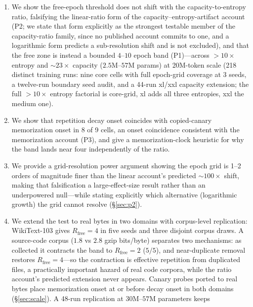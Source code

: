 \documentclass[11pt]{article}
\begin{document}
\begin{enumerate}
  \item We show the free-epoch threshold does not shift with the capacity-to-entropy
        ratio, falsifying the linear-ratio form of the capacity--entropy-artifact
        account (P2; we state that form explicitly as the strongest testable member
        of the capacity-ratio family, since no published account commits to one, and
        a logarithmic form predicts a sub-resolution shift and is not
        excluded), and that the free zone is instead a bounded $4$--$10$ epoch band
        (P1)---across $>10\times$ entropy and ${\sim}23\times$ capacity
        ($2.5$M--$57$M params) at 20M-token
        scale (218 distinct training runs: nine core cells with full epoch-grid
        coverage at 3 seeds, a twelve-run boundary seed audit, and a 44-run
        xl/xxl capacity extension; the full $>10\times$ entropy factorial is
        core-grid, xl adds all three entropies, xxl the medium one).
  \item We show that repetition decay onset coincides with copied-canary memorization
        onset in 8 of 9 cells, an onset coincidence consistent with the memorization
        account \citep{tirumala2022memorization} (P3), and give a memorization-clock
        heuristic for why the band lands near four independently of the ratio.
  \item We provide a grid-resolution power argument showing the epoch grid is
        1--2 orders of magnitude finer than the linear account's predicted
        ${\sim}100\times$ shift, making that falsification a large-effect-size result
        rather than an underpowered null---while stating explicitly which alternative
        (logarithmic growth) the grid cannot resolve (\S\ref{sec:p2}).
  \item We extend the test to real bytes in two domains with corpus-level
        replication: WikiText-103 gives $R_{\mathrm{free}}=4$ in five seeds and three
        disjoint corpus draws. A source-code corpus ($1.8$ vs $2.8$ gzip bits/byte)
        separates two mechanisms: as collected it contracts the band to
        $R_{\mathrm{free}}=2$ ($5/5$), and near-duplicate removal restores
        $R_{\mathrm{free}}=4$---so the contraction is effective repetition from
        duplicated files, a practically important hazard of real code corpora, while
        the ratio account's predicted extension never appears. Canary probes ported to
        real bytes place memorization onset at or before decay onset in both domains
        (\S\ref{sec:scale}). A 48-run replication at $30$M--$57$M parameters keeps

\end{enumerate}
\end{document}
